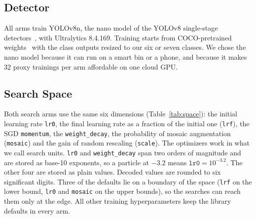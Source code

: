 \subsection{Detector}
\label{subsec:detector}

All arms train YOLOv8n, the nano model of the YOLOv8 single-stage detectors~\cite{redmon2016you,jocher2023ultralytics}, with Ultralytics 8.4.169. Training starts from COCO-pretrained weights~\cite{lin2014microsoft} with the class outputs resized to our six or seven classes. We chose the nano model because it can run on a smart bin or a phone, and because it makes 32 proxy trainings per arm affordable on one cloud GPU.

\subsection{Search Space}
\label{subsec:space}

Both search arms use the same six dimensions (Table~\ref{tab:space}): the initial learning rate \texttt{lr0}, the final learning rate as a fraction of the initial one (\texttt{lrf}), the SGD \texttt{momentum}, the \texttt{weight\_decay}, the probability of mosaic augmentation (\texttt{mosaic}) and the gain of random rescaling (\texttt{scale}). The optimizers work in what we call search units. \texttt{lr0} and \texttt{weight\_decay} span two orders of magnitude and are stored as base-10 exponents, so a particle at $-3.2$ means $\texttt{lr0}=10^{-3.2}$. The other four are stored as plain values. Decoded values are rounded to six significant digits. Three of the defaults lie on a boundary of the space (\texttt{lrf} on the lower bound, \texttt{lr0} and \texttt{mosaic} on the upper bounds), so the searches can reach them only at the edge. All other training hyperparameters keep the library defaults in every arm.

